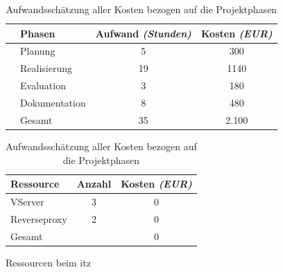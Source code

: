 \documentclass[11pt,a4paper]{article}
\begin{document}
\listoftables
\newpage
\begin{table}[!htbp]
  \begin{tabular}{c l c c}
                             & Phasen        & Aufwand \emph{(Stunden)} & Kosten \emph{(EUR)} \\
    \hline
    \cellcolor[HTML]{FFF587} & Planung       & 5                        & 300                 \\
    \cellcolor[HTML]{FF8C64} & Realisierung  & 19                       & 1140                \\
    \cellcolor[HTML]{FF665A} & Evaluation    & 3                        & 180                 \\
    \cellcolor[HTML]{7D6B7D} & Dokumentation & 8                        & 480                 \\
    \hline
                             & Gesamt        & 35                       & 2.100               \\
  \end{tabular}
  \begin{tabular}{l c c}
    Ressource    & Anzahl & Kosten  \emph{(EUR)} \\
    \hline
    VServer      & 3      & 0                    \\
    Reverseproxy & 2      & 0                    \\
    \hline
    Gesamt       &        & 0
  \end{tabular}
  Ressourcen beim \gls{itz}
  \caption{Aufwandsschätzung aller Kosten bezogen auf die Projektphasen }
  \label{table:aufwand}
\end{table}
\end{document}

